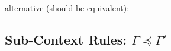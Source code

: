 \documentclass{article}
\begin{document}
alternative (should be equivalent):

\begin{prooftree}
\end{prooftree}


\subsection{Sub-Context Rules: $\Gamma \preceq \Gamma'$}


\begin{prooftree}
\end{prooftree}
\end{document}
